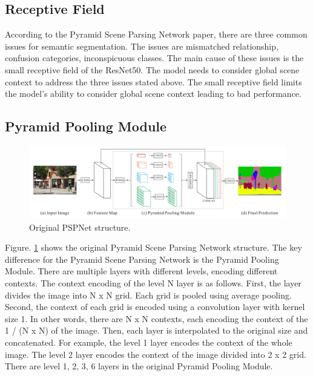\documentclass[10pt,twocolumn,letterpaper]{article}
\begin{document}
\subsection{Receptive Field}
According to the Pyramid Scene Parsing Network paper\cite{zhao2017pyramid}, there are three common issues for semantic segmentation. The issues are mismatched relationship, confusion categories, inconspicuous classes. The main cause of these issues is the small receptive field of the ResNet50\cite{he2015deep}. The model needs to consider global scene context to address the three issues stated above. The small receptive field limits the model's ability to consider global scene context leading to bad performance.

\subsection{Pyramid Pooling Module}
\begin{figure}[h]
  \centering
  \includegraphics[width=\linewidth]{figures/PSPNet.png}
  \caption{Original PSPNet\cite{zhao2017pyramid} structure.}
  \label{fig:PSPNet}
\end{figure}
Figure. \ref{fig:PSPNet} shows the original Pyramid Scene Parsing Network structure. The key difference for the Pyramid Scene Parsing Network is the Pyramid Pooling Module. There are multiple layers with different levels, encoding different contexts. The context encoding of the level N layer is as follows. First, the layer divides the image into N x N grid. Each grid is pooled using average pooling. Second, the context of each grid is encoded using a convolution layer with kernel size 1. In other words, there are N x N contexts, each encoding the context of the 1 / (N x N) of the image. Then, each layer is interpolated to the original size and concatenated. For example, the level 1 layer encodes the context of the whole image. The level 2 layer encodes the context of the image divided into 2 x 2 grid. There are level 1, 2, 3, 6 layers in the original Pyramid Pooling Module.
\end{document}
